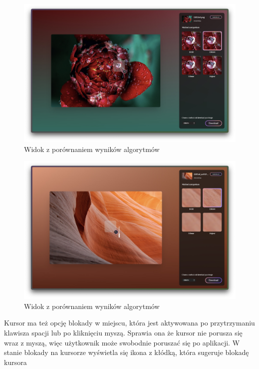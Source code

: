 \begin{figure}[H]
    \centering
    \includegraphics[width=\linewidth]{Rozdziały/06.Aplikacja/Obrazy/display4.jpg}  
    \caption{Widok z porównaniem wyników algorytmów}
    \label{fig:image93}
\end{figure}

\begin{figure}[H]
    \centering
    \includegraphics[width=\linewidth]{Rozdziały/06.Aplikacja/Obrazy/display1.jpg}  
    \caption{Widok z porównaniem wyników algorytmów}
    \label{fig:image94}
\end{figure}

\newpage
Kursor ma też opcję blokady w miejscu, która jest aktywowana po przytrzymaniu klawisza spacji lub po kliknięciu myszą. Sprawia ona że kursor nie porusza się wraz z myszą, więc użytkownik może swobodnie poruszać się po aplikacji. W stanie blokady na kursorze wyświetla się ikona z kłódką, która sugeruje blokadę kursora

